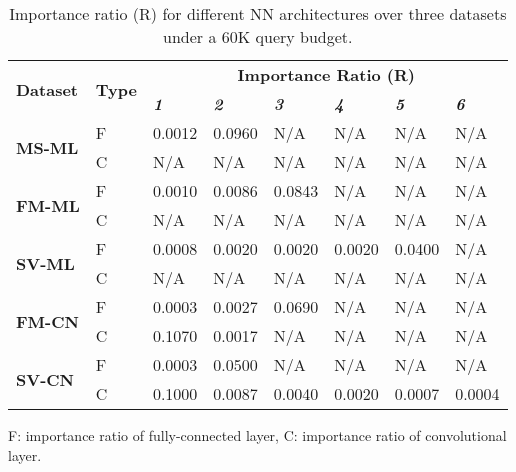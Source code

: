 \documentclass[10pt, twocolumn, conference]{IEEEtran}
\begin{document}
\begin{table}[h]
\begin{threeparttable}
\caption{Importance ratio (R) for different NN architectures over three datasets under a 60K query budget\textsuperscript{\textbf{\textcolor{gray}{}}}.} \vspace{-10pt}
\label{tab:table_2}
\begin{tabular}{|p{0.8cm}|p{0.5cm}|p{0.61cm}|p{0.61cm}|p{0.61cm}|p{0.61cm}|p{0.61cm}|p{0.61cm}|}
\hline
\multirow{ 2}{*}{\textbf{Dataset}} & \multirow{ 2}{*}{\textbf{Type}} &\multicolumn{6}{c|}{\textbf{Importance Ratio (R)}}\\\cline{3-8}
&  & \textbf{\textit{1}}& \textbf{\textit{2}}&\textbf{\textit{3}}&\textbf{\textit{4}}&\textbf{\textit{5}}&\textbf{\textit{6}} \\\hline
\multirow{ 2}{*}{\textbf{MS-ML}} & F & 0.0012 & 0.0960 & N/A & N/A & N/A & N/A \\ \cline{2-8}
{} & {C} & N/A & N/A & N/A & N/A & N/A & N/A \\ \hline
\multirow{ 2}{*}{\textbf{FM-ML}} & F & 0.0010 & 0.0086 & 0.0843 & N/A & N/A & N/A \\ \cline{2-8}
{} & {C} & N/A & N/A & N/A & N/A & N/A & N/A \\ \hline
\multirow{ 2}{*}{\textbf{SV-ML}} & F & 0.0008 & 0.0020 & 0.0020 & 0.0020 & 0.0400 & N/A \\ \cline{2-8}
{} & {C} & N/A & N/A & N/A & N/A & N/A & N/A \\ \hline
\multirow{ 2}{*}{\textbf{FM-CN}} & F & 0.0003 & 0.0027 & 0.0690 & N/A & N/A & N/A \\ \cline{2-8}
{} & {C} & 0.1070 & 0.0017 & N/A & N/A & N/A & N/A \\ \hline
\multirow{ 2}{*}{\textbf{SV-CN}} & F & 0.0003 & 0.0500 & N/A & N/A & N/A & N/A \\ \cline{2-8}
{} & {C} & 0.1000 & 0.0087 & 0.0040 & 0.0020 & 0.0007 & 0.0004 \\ \hline
\end{tabular}
\begin{tablenotes}
      \small
      \item [\textbf{\textcolor{gray}{\ding{68}}}] F: importance ratio of fully-connected layer, C: importance ratio of convolutional layer.
    \end{tablenotes}
  \end{threeparttable}
\end{table}
\end{document}
